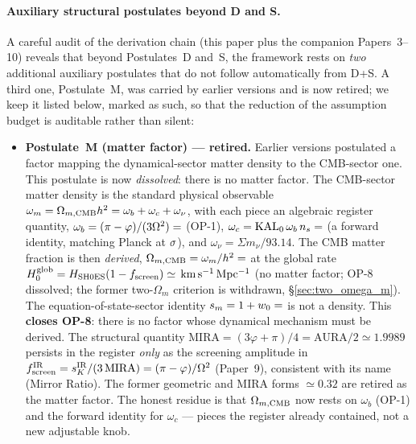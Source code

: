 \documentclass[12pt,a4paper]{article}
\newcommand{\kmsu}{\mathrm{km\,s^{-1}\,Mpc^{-1}}}
\begin{document}
\paragraph{Auxiliary structural postulates beyond D and S.}
A careful audit of the derivation chain (this paper plus the companion
Papers~3--10) reveals that beyond Postulates~D and~S, the framework rests on
\emph{two} additional auxiliary postulates that do not follow automatically
from D+S. A third one,
Postulate~M, was carried by earlier versions and is now retired; we keep it
listed below, marked as such, so that the reduction of the assumption budget
is auditable rather than silent:
\begin{itemize}\itemsep1pt
  \item \textbf{Postulate~M (matter factor) --- retired.} Earlier versions
        postulated a factor mapping the dynamical-sector matter density to the
        CMB-sector one. This postulate is now \emph{dissolved}: there is no
        matter factor. The CMB-sector matter density is the standard physical
        observable $\omega_m=\Omega_{m,\rm CMB}h^2=\omega_b+\omega_c+\omega_\nu$,
        with each piece an algebraic register quantity,
        $\omega_b=(\pi-\varphi)/(3\Omega^2)=\val{OMEGA_B_H2_d6}$ (OP-1),
        $\omega_c=\mathrm{KAL}_0\,\omega_b\,n_s=\val{OMEGA_C_H2_d6}$ (a forward identity,
        matching Planck at $\val{wc_ns_sigma_abs}\sigma$), and $\omega_\nu=\Sigma m_\nu/93.14$.
        The CMB matter fraction is then \emph{derived},
        $\Omega_{m,\rm CMB}=\omega_m/h^2=\val{OMEGA_M_TOTAL_d6}$ at the global rate
        $H_0^{\rm glob}=H_{\rm SH0ES}(1-f_{\rm screen})\simeq\val{H0_GLOBAL_d3}\,\kmsu$ (no matter factor; OP-8
        dissolved; the former two-$\Omega_m$ criterion is withdrawn,
        \S\ref{sec:two_omega_m}). The equation-of-state-sector identity
        $s_m=1+w_0=\val{S_M_d6}$ is not a density. This \textbf{closes OP-8}:
        there is no factor whose dynamical mechanism
        must be derived. The structural quantity
        $\mathrm{MIRA}=(3\varphi+\pi)/4=\mathrm{AURA}/2\simeq1.9989$ persists in
        the register \emph{only} as the screening amplitude in
        $f_{\rm screen}^{\rm IR}=s_K^{\rm IR}/(3\,\mathrm{MIRA})=(\pi-\varphi)/\Omega^2$
        (Paper~9), consistent with its name (Mirror Ratio). The former
        geometric and MIRA forms $\simeq0.32$ are retired as the matter factor.
        The honest residue is that $\Omega_{m,\rm CMB}$ now rests on $\omega_b$
        (OP-1) and the forward identity for $\omega_c$ --- pieces the register
        already contained, not a new adjustable knob.

\end{itemize}
\end{document}
